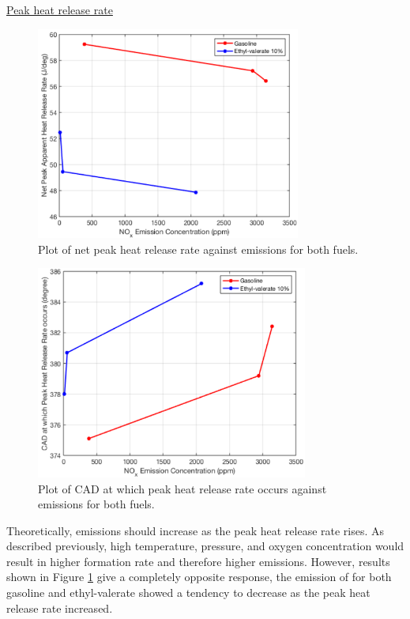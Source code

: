\documentclass[11pt]{article}
\begin{document}
{\centering
  \underline{Peak heat release rate}\par
}
\begin{figure}[H]
    \centering
    \includegraphics[height = 7cm]{./img/diagram6.png}
    \caption{Plot of net peak heat release rate against  emissions for both fuels.}
    \label{q2-f3}
\end{figure}
\begin{figure}[H]
    \centering
    \includegraphics[height = 7cm]{./img/diagram7.png}
    \caption{Plot of CAD at which peak heat release rate occurs against  emissions for both fuels.}
    \label{q2-f4}
\end{figure}
Theoretically,  emissions should increase as the peak heat release rate rises. As described previously, high temperature, pressure, and oxygen concentration would result in higher  formation rate and therefore higher emissions. However, results shown in Figure \ref{q2-f3} give a completely opposite response, the emission of  for both gasoline and ethyl-valerate showed a tendency to decrease as the peak heat release rate increased.  
\end{document}
